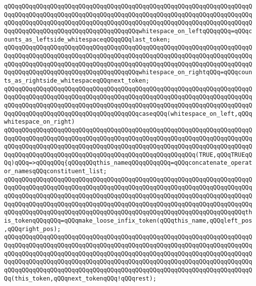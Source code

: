 \newline
\verb|qQQqqQQqqQQqqQQqqQQqqQQqqQQqqQQqqQQqqQQqqQQqqQQqqQQqqQQqqQQqqQQqqQQqqQQqqQQqqQQqqQQqqQQqqQQqqQQqqQQqqQQqqQQqqQQqqQQqqQQqqQQqqQQqqQQqqQQqqQQqqQQqqQQqqQQqqQQqqQQqqQQqqQQqqQQqqQQqqQQqqQQqqQQqqQQqqQQqqQQqqQQqqQQqqQQqqQQqqQQqqQQqqQQqqQQqqQQqqQQqqQQqqQQqwhitespace_on_leftqQQqqQQq=qQQqcounts_as_leftside_whitespaceqQQqqQQqlast_token;|\newline
\verb|qQQqqQQqqQQqqQQqqQQqqQQqqQQqqQQqqQQqqQQqqQQqqQQqqQQqqQQqqQQqqQQqqQQqqQQqqQQqqQQqqQQqqQQqqQQqqQQqqQQqqQQqqQQqqQQqqQQqqQQqqQQqqQQqqQQqqQQqqQQqqQQqqQQqqQQqqQQqqQQqqQQqqQQqqQQqqQQqqQQqqQQqqQQqqQQqqQQqqQQqqQQqqQQqqQQqqQQqqQQqqQQqqQQqqQQqqQQqqQQqqQQqqQQqwhitespace_on_rightqQQq=qQQqcounts_as_rightside_whitespaceqQQqnext_token;|\newline
\newline
\verb|qQQqqQQqqQQqqQQqqQQqqQQqqQQqqQQqqQQqqQQqqQQqqQQqqQQqqQQqqQQqqQQqqQQqqQQqqQQqqQQqqQQqqQQqqQQqqQQqqQQqqQQqqQQqqQQqqQQqqQQqqQQqqQQqqQQqqQQqqQQqqQQqqQQqqQQqqQQqqQQqqQQqqQQqqQQqqQQqqQQqqQQqqQQqqQQqqQQqqQQqqQQqqQQqqQQqqQQqqQQqqQQqqQQqqQQqqQQqqQQqqQQqqQQqcaseqQQq(whitespace_on_left,qQQqwhitespace_on_right)|\newline
\newline
\verb|qQQqqQQqqQQqqQQqqQQqqQQqqQQqqQQqqQQqqQQqqQQqqQQqqQQqqQQqqQQqqQQqqQQqqQQqqQQqqQQqqQQqqQQqqQQqqQQqqQQqqQQqqQQqqQQqqQQqqQQqqQQqqQQqqQQqqQQqqQQqqQQqqQQqqQQqqQQqqQQqqQQqqQQqqQQqqQQqqQQqqQQqqQQqqQQqqQQqqQQqqQQqqQQqqQQqqQQqqQQqqQQqqQQqqQQqqQQqqQQqqQQqqQQqqQQqqQQqqQQqqQQq(TRUE,qQQqTRUEqQQq)qQQq=>qQQqqQQq{qQQqqQQqthis_nameqQQqqQQqqQQq=qQQqconcatenate_operator_namesqQQqconstituent_list;|\newline
\verb|qQQqqQQqqQQqqQQqqQQqqQQqqQQqqQQqqQQqqQQqqQQqqQQqqQQqqQQqqQQqqQQqqQQqqQQqqQQqqQQqqQQqqQQqqQQqqQQqqQQqqQQqqQQqqQQqqQQqqQQqqQQqqQQqqQQqqQQqqQQqqQQqqQQqqQQqqQQqqQQqqQQqqQQqqQQqqQQqqQQqqQQqqQQqqQQqqQQqqQQqqQQqqQQqqQQqqQQqqQQqqQQqqQQqqQQqqQQqqQQqqQQqqQQqqQQqqQQqqQQqqQQqqQQqqQQqqQQqqQQqqQQqqQQqqQQqqQQqqQQqqQQqqQQqqQQqqQQqqQQqqQQqqQQqqQQqqQQqqQQqqQQqqQQqthis_tokenqQQqqQQq=qQQqmake_loose_infix_token(qQQqthis_name,qQQqleft_pos,qQQqright_pos);|\newline
\newline
\verb|qQQqqQQqqQQqqQQqqQQqqQQqqQQqqQQqqQQqqQQqqQQqqQQqqQQqqQQqqQQqqQQqqQQqqQQqqQQqqQQqqQQqqQQqqQQqqQQqqQQqqQQqqQQqqQQqqQQqqQQqqQQqqQQqqQQqqQQqqQQqqQQqqQQqqQQqqQQqqQQqqQQqqQQqqQQqqQQqqQQqqQQqqQQqqQQqqQQqqQQqqQQqqQQqqQQqqQQqqQQqqQQqqQQqqQQqqQQqqQQqqQQqqQQqqQQqqQQqqQQqqQQqqQQqqQQqqQQqqQQqqQQqqQQqqQQqqQQqqQQqqQQqqQQqqQQqqQQqqQQqqQQqqQQqqQQqqQQqqQQqqQQqqQQqqQQq(this_token,qQQqnext_tokenqQQq!qQQqrest);|\newline
